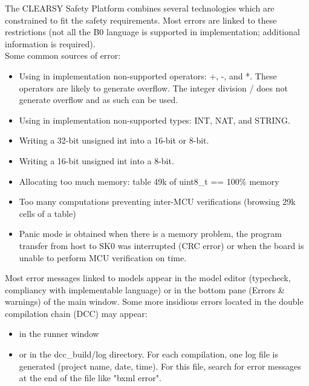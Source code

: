 The CLEARSY Safety Platform combines several technologies which are constrained to fit the safety requirements. Most errors are linked to these restrictions (not all the B0 language is supported in implementation; additional information is required).\\
Some common sources of error:
\begin{itemize}
    \item Using in implementation non-supported operators: +, -, and *. These operators are likely to generate overflow. The integer division / does not generate overflow and as such can be used.
    \item Using in implementation non-supported types: INT, NAT, and STRING.
    \item Writing a 32-bit unsigned int into a 16-bit or 8-bit.
    \item Writing a 16-bit unsigned int into a 8-bit.
    \item Allocating too much memory: table 49k of uint8\_t == 100\% memory
    \item Too many computations preventing inter-MCU verifications (browsing 29k cells of a table)
    \item Panic mode is obtained when there is a memory problem, the program transfer from host to SK0 was interrupted (CRC error) or when the board is unable to perform MCU verification on time.
\end{itemize}
Most error messages linked to models appear in the model editor (typecheck, compliancy with implementable language) or in the bottom pane (Errors \& warnings) of the main window. 
Some more insidious errors located in the double compilation chain (DCC) may appear:
\begin{itemize}
    \item in the runner window 
    \item or in the dcc\_build/log directory. For each compilation, one log file is generated (project name, date, time). For this file, search for error messages at the end of the file like "bxml error".
\end{itemize}

